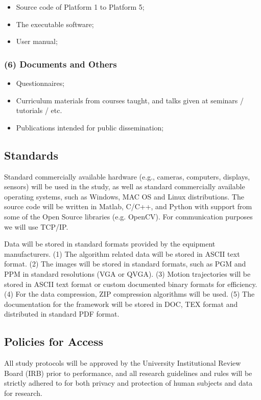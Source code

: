 \begin{itemize} \itemsep0pt \parskip0pt 
\item Source code of Platform 1 to Platform 5;
\item The executable software;
\item User manual;
\end{itemize}

\vspace{-10pt}


\subsubsection*{(6) Documents and Others}

\begin{itemize} \itemsep0pt \parskip0pt 
\item Questionnaires;
\item Curriculum materials from courses taught, and talks given at seminars / tutorials / etc.
\item Publications intended for public dissemination;
\end{itemize}

\subsection{Standards}
Standard commercially available hardware (e.g., cameras, computers, displays, sensors) will be used in the study, as well as standard commercially available operating systems, such as Windows, MAC OS and Linux distributions. The source code will be written in Matlab, C/C++, and Python with support from some of the Open Source libraries (e.g. OpenCV). For communication purposes we will use TCP/IP.

Data will be stored in standard formats provided by the equipment manufacturers. (1) The algorithm related data will be stored in ASCII text format. (2) The images will be stored in standard formats, such as PGM and PPM in standard resolutions (VGA or QVGA). (3) Motion trajectories will be stored in ASCII text format or custom documented binary formats for efficiency. (4) For the data compression, ZIP compression algorithms will be used. (5) The documentation for the framework will be stored in DOC, TEX format and distributed in standard PDF format.


\subsection{Policies for Access}
All study protocols will be approved by the University Institutional Review Board (IRB) prior to performance, and all research guidelines and rules will be strictly adhered to for both privacy and protection of human subjects and data for research.

